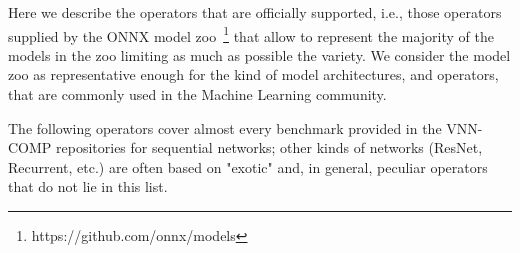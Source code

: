 Here we describe the operators that are officially supported, i.e.,
those operators supplied by the ONNX model 
zoo~\footnote{https://github.com/onnx/models} that allow to represent
the majority of the models in the zoo limiting as much as possible the
variety. We consider the model zoo as representative enough for the 
kind of model architectures, and operators, that are commonly used in
the Machine Learning community.

The following operators cover almost every benchmark provided in the
VNN-COMP repositories for sequential networks; other kinds of networks
(ResNet, Recurrent, etc.) are often based on "exotic" and, in general,
peculiar operators that do not lie in this list.


